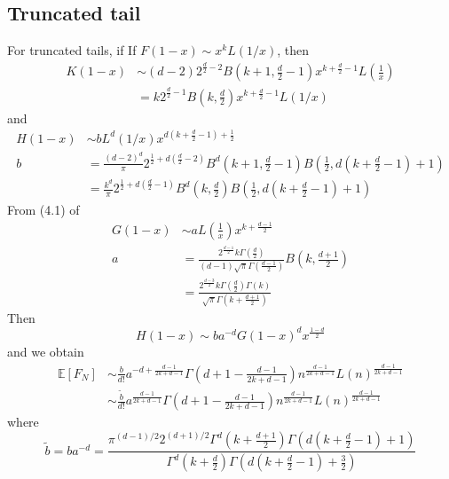 \documentclass{article}
\def\E{\mathbb{E}}
\begin{document}
\subsection{Truncated tail}
For truncated tails, if If $F(1-x) \sim x^k L(1/x)$,
then
\begin{align}
    K(1-x) & \sim (d-2)2^{\frac{d}{2}-2} B(k+1,\frac{d}{2}-1)x^{k+\frac{d}{2}-1}L(\frac{1}{x})\\
    & = k 2^{\frac{d}{2}-1} B(k, \frac{d}{2}) x^{k+\frac{d}{2}-1} L(1/x) 
\end{align}
and
\begin{align}
    H(1-x)  & \sim b
    L^d(1/x) x^{d(k+\frac{d}{2}-1)+\frac{1}{2}} \\
    b & = \frac{(d-2)^d}{\pi}
    2^{\frac{1}{2} + d(\frac{d}{2}-2)} B^d(k+1, \frac{d}{2}-1)
    B\left( \frac{1}{2},
    d(k+\frac{d}{2} -1)+1 \right) \\
    &=  \frac{k^d}{\pi}
    2^{\frac{1}{2} + d(\frac{d}{2}-1)} B^d(k, \frac{d}{2})
    B\left( \frac{1}{2},
    d(k+\frac{d}{2} -1)+1 \right)
\end{align}
From (4.1) of \cite{dwyer1991convex}
\begin{align}
    G(1-x) &\sim a
    L\left(\frac{1}{x} \right)
    x^{k+\frac{d-1}{2}} \\
    a &=\frac{2^{\frac{d-1}{2}} k \Gamma(\frac{d}{2})}
    {(d-1) \sqrt{\pi} \Gamma(\frac{d-1}{2})}
    B\left(k, \frac{d+1}{2}\right) \\
    &= \frac{2^{\frac{d-3}{2}} k \Gamma(\frac{d}{2})\Gamma(k)}
    {\sqrt{\pi} \Gamma\left(k+\frac{d+1}{2}\right)}
\end{align}
Then
\begin{equation}
    H(1-x) \sim ba^{-d} G(1-x)^d x^{\frac{1-d}{2}}
\end{equation}
and we obtain
\begin{align}\label{eq:efn_truncated_formula}
    \E[F_N] &\sim \frac{b}{d!}a^{-d+\frac{d-1}{2k+d-1}}
    \Gamma\left(d+1-\frac{d-1}{2k+d-1}\right)n^{\frac{d-1}{2k+d-1}}
    L(n)
    ^{\frac{d-1}{2k+d-1}} \\
    &\sim \frac{\tilde{b} }{d!}
    a^{\frac{d-1}{2k+d-1}}\Gamma\left(d+1-\frac{d-1}{2k+d-1}\right)n^{\frac{d-1}{2k+d-1}}
    L(n)
    ^{\frac{d-1}{2k+d-1}}
\end{align}
where
\begin{equation}
    \tilde{b} =ba^{-d}
    = \frac{\pi^{(d-1)/2} 2^{(d+1)/2}
    \Gamma^d(k+\frac{d+1}{2})
    \Gamma(d(k+\frac{d}{2}-1)+1)}{\Gamma^d(k+\frac{d}{2})\Gamma(d(k+\frac{d}{2}-1)+ \frac{3}{2})}
\end{equation}
\end{document}
